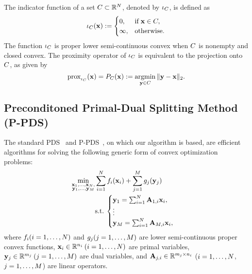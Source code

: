 The indicator function of a set $C \subset \mathbb{R}^{N}$, denoted by $\iota_{C}$, is defined as 
\begin{equation}
	\label{eq:Indicator_Function}
	\iota_{C} (\mathbf{x}) := 
	\begin{cases}
		0, & \mathrm{if} \: \mathbf{x} \in C, \\
		\infty, & \mathrm{otherwise}.
	\end{cases}
\end{equation}
The function $\iota_{C}$ is proper lower semi-continuous convex when $C$ is nonempty and closed convex.
The proximity operator of $\iota_{C}$ is equivalent to the projection onto $C$, as given by
\begin{equation}
	\label{eq:Projection}
	\operatorname{prox}_{\iota_{C}} (\mathbf{x}) = P_{C}(\mathbf{x}) := \mathop{\mathrm{argmin}}\limits_{\mathbf{y} \in C} \|\mathbf{y} - \mathbf{x} \|_{2}.
\end{equation}


\subsection{Preconditoned Primal-Dual Splitting Method (P-PDS)}
\label{subsec:P-PDS}
The standard PDS~\cite{Chambolle2011PDS, Condat2013PDS} and P-PDS~\cite{Pock2011PPDS}, on which our algorithm is based, are efficient algorithms for solving the following generic form of convex optimization problems:
\begin{align}
	\label{prob:convex_optim_prob}
	\min_{\substack{\mathbf{x}_{1}, \ldots, \mathbf{x}_{N}, \\ 
			\mathbf{y}_{1}, \ldots, \mathbf{y}_{M}}} 
	& \sum_{i=1}^{N} f_{i} (\mathbf{x}_{i}) + \sum_{j=1}^{M} g_{j} (\mathbf{y}_{j}) \nonumber \\ 
	& \mathrm{s.t.} \:
	\begin{cases} 
		\mathbf{y}_{1} = \sum_{i=1}^{N} \mathbf{A}_{1,i} \mathbf{x}_{i}, \\ 
		\vdots \\ 
		\mathbf{y}_{M} = \sum_{i=1}^{N} \mathbf{A}_{M,i} \mathbf{x}_{i}, 
	\end{cases}
\end{align}
where $f_{i} (i = 1, \ldots, N)$ and $g_{j} (j = 1, \ldots, M)$ are lower semi-continuous proper convex functions, $\mathbf{x}_{i} \in \mathbb{R}^{n_{i}} \: (i = 1, \dots, N)$ are primal variables, $\mathbf{y}_{j} \in \mathbb{R}^{m_{j}} \: (j = 1, \dots, M)$ are dual variables, and $\mathbf{A}_{j,i} \in \mathbb{R}^{m_{j} \times  n_{i}}$ ($i = 1, \ldots, N$, $j = 1, \ldots, M$) are linear operators.

